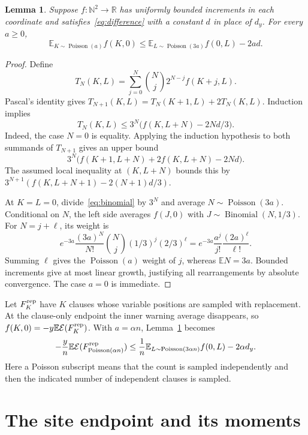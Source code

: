 \documentclass[11pt]{article}
\newtheorem{lemma}[theorem]{Lemma}
\theoremstyle{remark}
\newcommand{\E}{\mathbb{E}}
\newcommand{\Pois}{\operatorname{Poisson}}
\newcommand{\Bin}{\operatorname{Binomial}}
\newcommand{\en}{\mathcal{E}}
\begin{document}
\begin{lemma}\label{lem:comparison}
Suppose $f:\mathbb{N}^2\to\mathbb{R}$ has uniformly bounded increments
in each coordinate and satisfies~\eqref{eq:difference} with a constant
$d$ in place of $d_y$. For every $a\geq0$,
\begin{equation}\label{eq:comparison}
 \E_{K\sim\Pois(a)}f(K,0)
 \leq\E_{L\sim\Pois(3a)}f(0,L)-2ad.
\end{equation}
\end{lemma}
\begin{proof}
Define
\[
 T_N(K,L)=\sum_{j=0}^N\binom Nj2^{N-j}f(K+j,L).
\]
Pascal's identity gives
$T_{N+1}(K,L)=T_N(K+1,L)+2T_N(K,L)$. Induction implies
\begin{equation}\label{eq:binomial}
 T_N(K,L)\leq3^N\bigl(f(K,L+N)-2Nd/3\bigr).
\end{equation}
Indeed, the case $N=0$ is equality. Applying the induction hypothesis to
both summands of $T_{N+1}$ gives an upper bound
\[
 3^N\bigl(f(K+1,L+N)+2f(K,L+N)-2Nd\bigr).
\]
The assumed local inequality at $(K,L+N)$ bounds this by
$3^{N+1}(f(K,L+N+1)-2(N+1)d/3)$.

At $K=L=0$, divide~\eqref{eq:binomial} by $3^N$ and average
$N\sim\Pois(3a)$. Conditional on $N$, the left side averages
$f(J,0)$ with $J\sim\Bin(N,1/3)$. For $N=j+\ell$, its weight is
\[
 e^{-3a}\frac{(3a)^N}{N!}\binom Nj(1/3)^j(2/3)^\ell
 =e^{-3a}\frac{a^j}{j!}\frac{(2a)^\ell}{\ell!}.
\]
Summing $\ell$ gives the $\Pois(a)$ weight of $j$, whereas
$\E N=3a$. Bounded increments give at most linear growth, justifying
all rearrangements by absolute convergence. The case $a=0$ is immediate.
\end{proof}

Let $F^{\rm rep}_K$ have $K$ clauses whose variable positions are sampled
with replacement. At the clause-only endpoint the inner warning average
disappears, so $f(K,0)=-y\E\en(F^{\rm rep}_K)$. With $a=\alpha n$,
Lemma~\ref{lem:comparison} becomes
\begin{equation}\label{eq:poissonenergy}
 -\frac yn\E\en(F^{\rm rep}_{\Pois(\alpha n)})
 \leq\frac1n\E_{L\sim\Pois(3\alpha n)}f(0,L)-2\alpha d_y.
\end{equation}
Here a Poisson subscript means that the count is sampled independently
and then the indicated number of independent clauses is sampled.

\section{The site endpoint and its moments}
\end{document}
